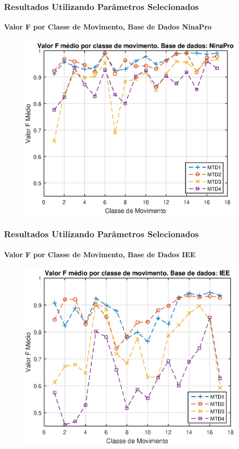 \documentclass{beamer}
\begin{document}
	\begin{frame}
		\frametitle{Resultados Utilizando Parâmetros Selecionados}
		\framesubtitle{Valor F por Classe de Movimento, Base de Dados NinaPro}
		
		\begin{figure}
			\begin{center}
				\includegraphics[width=\textwidth]{./img/fvalue_nina.eps}
			\end{center}
		\end{figure}
		
	\end{frame}
	
	\begin{frame}
		\frametitle{Resultados Utilizando Parâmetros Selecionados}
		\framesubtitle{Valor F por Classe de Movimento, Base de Dados IEE}
		
		\begin{figure}
			\begin{center}
				\includegraphics[width=\textwidth]{./img/fvalue_iee.eps}
			\end{center}
		\end{figure}
		
	\end{frame}
	
\end{document}
